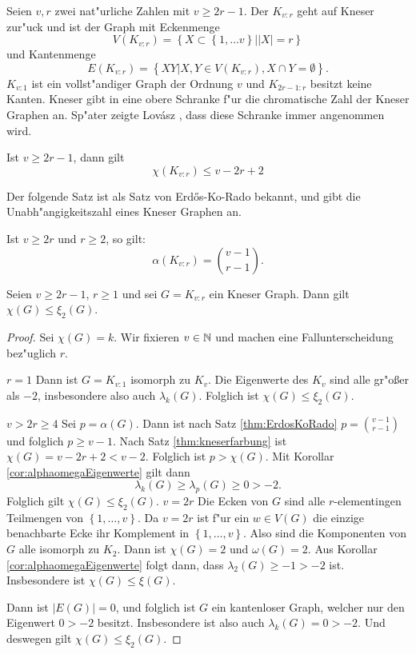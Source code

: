 Seien $v,r$ zwei nat"urliche Zahlen mit $v\geq 2r-1$. Der  $K_{v:r}$ geht auf Kneser \cite{Kneser55} zur"uck und ist der Graph mit Eckenmenge $$V(K_{v:r}) = \left\{ X \subset \left\{ 1,\dots v \right\} | |X| = r \right\}$$ und Kantenmenge 
 $$E(K_{v:r}) = \left\{ XY| X,Y \in V(K_{v:r}), X \cap Y = \emptyset \right\}.$$ 
 $K_{v:1}$ ist ein vollst"andiger Graph der Ordnung $v$ und $K_{2r-1:r}$ besitzt keine Kanten. Kneser gibt in \cite{Kneser55} eine obere Schranke f"ur die chromatische Zahl der Kneser Graphen an. Sp"ater zeigte Lov\'asz , dass diese Schranke immer angenommen wird.
 \begin{theorem}
   Ist $v\geq 2r-1$, dann gilt
   $$\chi(K_{v:r}) \leq v-2r+2$$
   \label{thm:kneserfarbung}
 \end{theorem}
 Der folgende Satz ist als Satz von Erd\H{o}s-Ko-Rado \cite{ErdosKoRado61} bekannt, und gibt die Unabh"angigkeitszahl eines Kneser Graphen an.
 \begin{theorem}
   Ist $v\geq 2r$ und $r \geq 2$, so gilt: 
   $$\alpha(K_{v:r})= \binom{v-1}{r-1}.$$
   \label{thm:ErdosKoRado}
 \end{theorem}

\begin{proposition}
  Seien $v\geq 2r-1$, $r\geq 1$ und sei $G= K_{v:r}$ ein Kneser Graph. Dann gilt $\chi(G) \leq \xi_{2}(G)$. 
\end{proposition}

\begin{proof}
  Sei $\chi(G) = k$. Wir fixieren $v\in {\mathbb{N}}$ und machen eine Fallunterscheidung bez"uglich $r$. 

   {$r=1$} Dann ist $G=K_{v:1}$ isomorph zu $K_v$. Die Eigenwerte des $K_v$ sind alle gr"o{\ss}er als $-2$, insbesondere also auch $\lambda_{k}(G)$. Folglich ist $\chi(G) \leq \xi_{2}(G)$. 

   {$v > 2r \geq 4 $} Sei $p = \alpha(G)$.  Dann ist nach Satz \ref{thm:ErdosKoRado} $ p = \binom{v-1}{r-1}$ und folglich $ p \geq v-1$. Nach Satz \ref{thm:kneserfarbung} ist $\chi(G) = v-2r+2 < v-2$. Folglich ist $p > \chi(G)$. Mit  Korollar \ref{cor:alphaomegaEigenwerte} gilt dann \begin{equation*}
    \lambda_{k}(G) \geq \lambda_{p}(G) \geq 0 > -2.
  \end{equation*}
  Folglich gilt $\chi(G) \leq \xi_{2}(G)$.
   {$ v = 2r $} Die Ecken von $G$ sind alle $r$-elementingen Teilmengen von $\left\{ 1,\dots,v \right\}$. Da $v=2r$ ist f"ur ein $w\in V(G)$ die einzige benachbarte Ecke ihr Komplement in $\left\{ 1,\dots,v \right\}$. Also sind die Komponenten von $G$ alle isomorph zu $K_{2}$. Dann ist $\chi(G) = 2$ und $\omega(G) = 2$. Aus Korollar \ref{cor:alphaomegaEigenwerte} folgt dann, dass $\lambda_{2}(G) \geq -1 > -2$ ist. Insbesondere ist $\chi(G) \leq \xi(G)$. 

   Dann ist $|E(G)| = 0$, und folglich ist $G$ ein kantenloser Graph, welcher nur den Eigenwert $0>-2$ besitzt. Insbesondere ist also auch $\lambda_{k}(G) = 0 > -2$. Und deswegen gilt $\chi(G) \leq \xi_{2}(G)$.
\end{proof}

